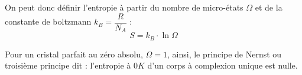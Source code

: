 \documentclass[13pt, twoside, a4paper, french]{report}
\begin{document}
            On peut donc définir l'entropie à partir du nombre de micro-états $\Omega$ et de la constante de boltzmann $k_B = \dfrac{R}{N_A}$ :
            \[S = k_B \cdot \ln \Omega\]

            Pour un cristal parfait au zéro absolu, $\Omega = 1$, ainsi, le principe de Nernst ou troisième principe dit : l'entropie à $0K$ d'un corps à complexion unique est nulle.
\end{document}
